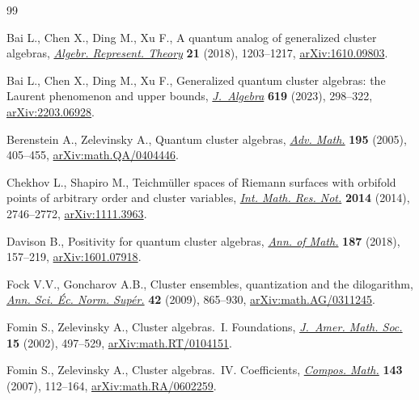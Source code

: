 \documentclass[10pt,a4paper]{amsart}
\numberwithin{equation}{section}
\begin{document}
\begin{thebibliography}{99}
\footnotesize\itemsep=0pt

Bai L., Chen X., Ding M., Xu F., A quantum analog of generalized cluster
  algebras, \href{https://doi.org/10.1007/s10468-017-9743-7}{\textit{Algebr. Represent. Theory}} \textbf{21} (2018), 1203--1217,
  \href{https://arxiv.org/abs/1610.09803}{arXiv:1610.09803}.

Bai L., Chen X., Ding M., Xu F., Generalized quantum cluster algebras: the
  {L}aurent phenomenon and upper bounds, \href{https://doi.org/10.1016/j.jalgebra.2022.12.012}{\textit{J.~Algebra}} \textbf{619}
  (2023), 298--322, \href{https://arxiv.org/abs/2203.06928}{arXiv:2203.06928}.

Berenstein A., Zelevinsky A., Quantum cluster algebras, \href{https://doi.org/10.1016/j.aim.2004.08.003}{\textit{Adv. Math.}}
  \textbf{195} (2005), 405--455, \href{https://arxiv.org/abs/math.QA/0404446}{arXiv:math.QA/0404446}.

Chekhov L., Shapiro M., Teichm\"uller spaces of {R}iemann surfaces with
  orbifold points of arbitrary order and cluster variables,  \href{https://doi.org/10.1093/imrn/rnt016}{\textit{Int. Math.
  Res. Not.}} \textbf{2014} (2014), 2746--2772, \href{https://arxiv.org/abs/1111.3963}{arXiv:1111.3963}.

Davison B., Positivity for quantum cluster algebras,  \href{https://doi.org/10.4007/annals.2018.187.1.3}{\textit{Ann. of Math.}}
  \textbf{187} (2018), 157--219, \href{https://arxiv.org/abs/1601.07918}{arXiv:1601.07918}.

Fock V.V., Goncharov A.B., Cluster ensembles, quantization and the dilogarithm,
   \href{https://doi.org/10.24033/asens.2112}{\textit{Ann. Sci. \'Ec. Norm. Sup\'er.}} \textbf{42} (2009), 865--930,
  \href{https://arxiv.org/abs/math.AG/0311245}{arXiv:math.AG/0311245}.

Fomin S., Zelevinsky A., Cluster algebras.~{I}. {F}oundations, \href{https://doi.org/10.1090/S0894-0347-01-00385-X}{\textit{J.~Amer.
  Math. Soc.}} \textbf{15} (2002), 497--529, \href{https://arxiv.org/abs/math.RT/0104151}{arXiv:math.RT/0104151}.

Fomin S., Zelevinsky A., Cluster algebras.~{IV}. {C}oefficients,
  \href{https://doi.org/10.1112/S0010437X06002521}{\textit{Compos. Math.}} \textbf{143} (2007), 112--164,
  \href{https://arxiv.org/abs/math.RA/0602259}{arXiv:math.RA/0602259}.


\end{thebibliography}
\end{document}
